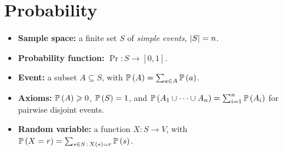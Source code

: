 \section{Probability}

\begin{itemize}
    \item \textbf{Sample space:} a finite set $S$ of \emph{simple events}, $\left\lvert S\right\rvert = n$.
    \item \textbf{Probability function:} $\Pr \colon S \to [0,1]$.
    \item \textbf{Event:} a subset $A \subseteq S$, with $\prob{A} = \sum_{a \in A} \prob{a}$.
    \item \textbf{Axioms:} $\prob{A} \geq 0$, $\prob{S} = 1$, and
          $\prob{A_1 \cup \dots \cup A_n} = \sum_{i=1}^{n} \prob{A_i}$ for pairwise disjoint events.
    \item \textbf{Random variable:} a function $X \colon S \to V$, with
          $\prob{X = r} = \sum_{s \in S \,:\, X(s) = r} \prob{s}$.
\end{itemize}
